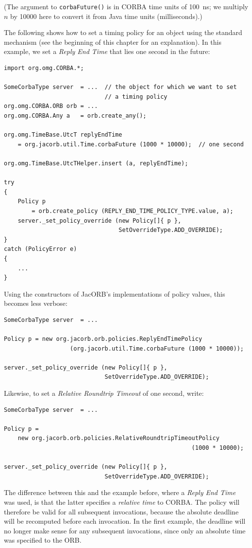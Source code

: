 (The argument to {\tt corbaFuture()} is in CORBA time units of
100~ns; we multiply $n$ by 10000 here to convert it from Java time
units (milliseconds).)

The following shows how to set a timing policy for an object using the
standard mechanism (see the beginning of this chapter for an
explanation).  In this example, we set a \emph{Reply End Time} that
lies one second in the future:

\begin{verbatim}
import org.omg.CORBA.*;

SomeCorbaType server  = ...  // the object for which we want to set
                             // a timing policy
org.omg.CORBA.ORB orb = ...
org.omg.CORBA.Any a   = orb.create_any();

org.omg.TimeBase.UtcT replyEndTime
    = org.jacorb.util.Time.corbaFuture (1000 * 10000);  // one second

org.omg.TimeBase.UtcTHelper.insert (a, replyEndTime);

try
{
    Policy p
        = orb.create_policy (REPLY_END_TIME_POLICY_TYPE.value, a);
    server._set_policy_override (new Policy[]{ p },
                                 SetOverrideType.ADD_OVERRIDE);
}
catch (PolicyError e)
{
    ...
}
\end{verbatim}

\clearpage{}

Using the constructors of JacORB's implementations of policy values,
this becomes less verbose:

\begin{verbatim}
SomeCorbaType server  = ...

Policy p = new org.jacorb.orb.policies.ReplyEndTimePolicy
                   (org.jacorb.util.Time.corbaFuture (1000 * 10000));

server._set_policy_override (new Policy[]{ p },
                             SetOverrideType.ADD_OVERRIDE);
\end{verbatim}

Likewise, to set a \emph{Relative Roundtrip Timeout} of one second,
write:

\begin{verbatim}
SomeCorbaType server  = ...

Policy p =
    new org.jacorb.orb.policies.RelativeRoundtripTimeoutPolicy 
                                                      (1000 * 10000);

server._set_policy_override (new Policy[]{ p },
                             SetOverrideType.ADD_OVERRIDE);
\end{verbatim}

The difference between this and the example before, where a
\emph{Reply End Time} was used, is that the latter specifies a
\emph{relative time} to CORBA.  The policy will therefore be valid
for all subsequent invocations, because the absolute deadline will be
recomputed before each invocation.  In the first example, the
deadline will no longer make sense for any subsequent invocations,
since only an absolute time was specified to the ORB.


